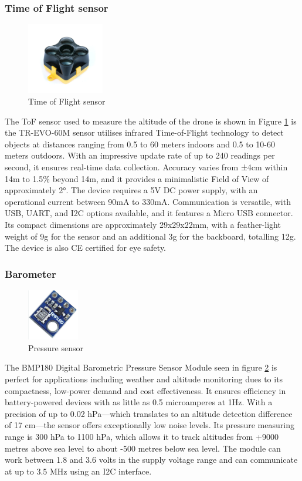 \documentclass{article}
\begin{document}
\subsubsection{Time of Flight sensor}
\begin{figure}[H]
  \centering
  \includegraphics[width=0.3\textwidth]{Pictures/ToF_sensor.png}
  \caption{Time of Flight sensor}
  \label{fig:ToF}
\end{figure}
The ToF sensor used to measure the altitude of the drone is shown in Figure
\ref{fig:ToF} is the TR-EVO-60M sensor utilises infrared Time-of-Flight
technology to detect objects at distances ranging from 0.5 to 60 meters indoors
and 0.5 to 10-60 meters outdoors. With an impressive update rate of up to 240
readings per second, it ensures real-time data collection. Accuracy varies from
±4cm within 14m to 1.5\% beyond 14m, and it provides a minimalistic Field of
View of approximately 2°. The device requires a 5V DC power supply, with an
operational current between 90mA to 330mA. Communication is versatile, with USB,
UART, and I2C options available, and it features a Micro USB connector. Its
compact dimensions are approximately 29x29x22mm, with a feather-light weight of
9g for the sensor and an additional 3g for the backboard, totalling 12g. The
device is also CE certified for eye safety.

\subsubsection{Barometer}
\begin{figure}[H]
  \centering
  \includegraphics[width=0.2\textwidth]{Pictures/bmp180.png}
  \caption{Pressure sensor}
  \label{fig:bmp180}
\end{figure}
The BMP180 Digital Barometric Pressure Sensor Module seen in figure
\ref{fig:bmp180} is perfect for applications including weather and altitude
monitoring dues to its compactness, low-power demand and cost effectiveness. It
ensures efficiency in battery-powered devices with as little as 0.5 microamperes
at 1Hz. With a precision of up to 0.02 hPa—which translates to an altitude
detection difference of 17 cm—the sensor offers exceptionally low noise levels.
Its pressure measuring range is 300 hPa to 1100 hPa, which allows it to track
altitudes from +9000 metres above sea level to about -500 metres below sea
level. The module can work between 1.8 and 3.6 volts in the supply voltage range
and can communicate at up to 3.5 MHz using an I2C interface.
\end{document}
